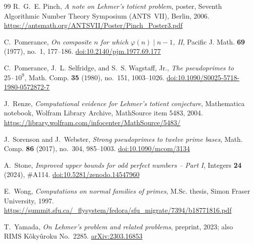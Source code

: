 \documentclass[screen,reqno]{aomart}
\numberwithin{equation}{section}
\theoremstyle{plain}
\theoremstyle{definition}
\theoremstyle{remark}
\begin{document}
\begin{thebibliography}{99}
R.~G.~E. Pinch,
\emph{A note on Lehmer's totient problem},
poster, Seventh Algorithmic Number Theory Symposium (ANTS~VII), Berlin, 2006.
\url{https://antsmath.org/ANTSVII/Poster/Pinch_Poster3.pdf}

C.~Pomerance,
\emph{On composite $n$ for which $\varphi(n)\mid n-1$, II},
Pacific J. Math. \textbf{69} (1977), no.~1, 177--186.
\href{https://doi.org/10.2140/pjm.1977.69.177}{doi:10.2140/pjm.1977.69.177}

C.~Pomerance, J.~L. Selfridge, and S.~S. Wagstaff, Jr.,
\emph{The pseudoprimes to $25\cdot10^9$},
Math. Comp. \textbf{35} (1980), no.~151, 1003--1026.
\href{https://doi.org/10.1090/S0025-5718-1980-0572872-7}{doi:10.1090/S0025-5718-1980-0572872-7}

J.~Renze,
\emph{Computational evidence for Lehmer's totient conjecture},
Mathematica notebook, Wolfram Library Archive, MathSource item 5483, 2004.
\url{https://library.wolfram.com/infocenter/MathSource/5483/}

J.~Sorenson and J.~Webster,
\emph{Strong pseudoprimes to twelve prime bases},
Math. Comp. \textbf{86} (2017), no.~304, 985--1003.
\href{https://doi.org/10.1090/mcom/3134}{doi:10.1090/mcom/3134}

A.~Stone,
\emph{Improved upper bounds for odd perfect numbers -- Part I},
Integers \textbf{24} (2024), \#A114.
\href{https://doi.org/10.5281/zenodo.14547960}{doi:10.5281/zenodo.14547960}

E.~Wong,
\emph{Computations on normal families of primes},
M.Sc. thesis, Simon Fraser University, 1997.
\url{https://summit.sfu.ca/_flysystem/fedora/sfu_migrate/7394/b18771816.pdf}

T.~Yamada,
\emph{On Lehmer's problem and related problems},
preprint, 2023; also RIMS K\^oky\^uroku No.~2285.
\href{https://arxiv.org/abs/2303.16853}{arXiv:2303.16853}

\end{thebibliography}
\end{document}
